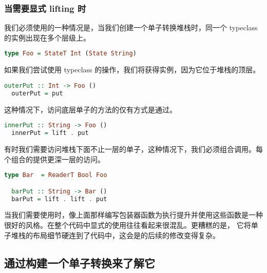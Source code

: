 \documentclass[./main.tex]{subfiles}
\begin{document}
\subsubsection*{当需要显式 lifting 时}

我们必须使用的一种情况是，当我们创建一个单子转换堆栈时，同一个 typeclass 的实例出现在多个层级上。

\begin{lstlisting}[language=Haskell]
  type Foo = StateT Int (State String)
\end{lstlisting}

如果我们尝试使用 typeclass 的操作，我们将获得实例，因为它位于堆栈的顶层。

\begin{lstlisting}[language=Haskell]
  outerPut :: Int -> Foo ()
  outerPut = put
\end{lstlisting}

这种情况下，访问底层单子的方法的仅有方式是通过。

\begin{lstlisting}[language=Haskell]
  innerPut :: String -> Foo ()
  innerPut = lift . put
\end{lstlisting}

有时我们需要访问堆栈下面不止一层的单子，这种情况下，我们必须组合调用。每个组合的提供更深一层的访问。

\begin{lstlisting}[language=Haskell]
  type Bar  = ReaderT Bool Foo

  barPut :: String -> Bar ()
  barPut = lift . lift . put
\end{lstlisting}

当我们需要使用时，像上面那样编写包装器函数为执行提升并使用这些函数是一种很好的风格。在整个代码中显式的使用往往看起来很混乱。更糟糕的是，
它将单子堆栈的布局细节硬连到了代码中，这会是的后续的修改变得复杂。

\subsection*{通过构建一个单子转换来了解它}

%

\begin{lstlisting}[language=Haskell]

\end{lstlisting}
\end{document}

